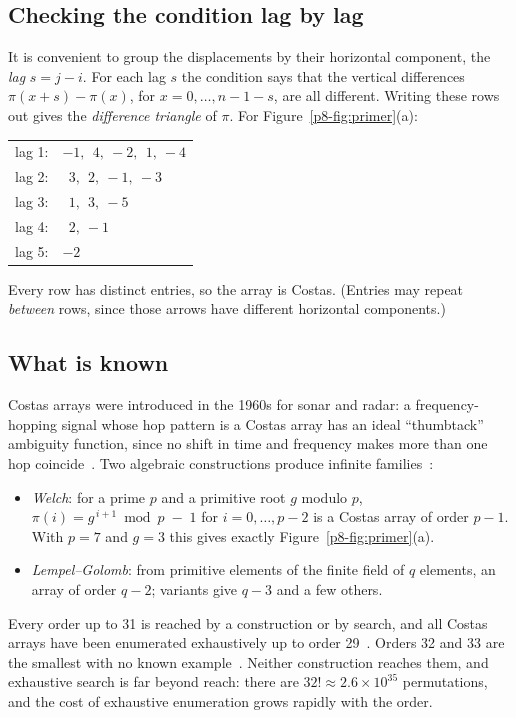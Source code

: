 \documentclass[11pt,a4paper,oneside]{report}
\theoremstyle{definition}
\begin{document}
\subsection{Checking the condition lag by lag}

It is convenient to group the displacements by their horizontal component, the \emph{lag}
$s=j-i$. For each lag $s$ the condition says that the vertical differences
$\pi(x+s)-\pi(x)$, for $x=0,\dots,n-1-s$, are all different. Writing these rows out gives
the \emph{difference triangle} of $\pi$. For Figure~\ref{p8-fig:primer}(a):
\begin{center}
\begin{tabular}{@{}r l@{}}
lag 1: & $-1,\ \ 4,\ -2,\ \ 1,\ -4$\\
lag 2: & $\ \ 3,\ \ 2,\ -1,\ -3$\\
lag 3: & $\ \ 1,\ \ 3,\ -5$\\
lag 4: & $\ \ 2,\ -1$\\
lag 5: & $-2$
\end{tabular}
\end{center}
Every row has distinct entries, so the array is Costas. (Entries may repeat \emph{between}
rows, since those arrows have different horizontal components.)

\subsection{What is known}

Costas arrays were introduced in the 1960s for sonar and radar: a frequency-hopping signal
whose hop pattern is a Costas array has an ideal ``thumbtack'' ambiguity function, since no
shift in time and frequency makes more than one hop coincide~\cite{p8-costas1984}. Two algebraic
constructions produce infinite families~\cite{p8-golombtaylor1984}:
\begin{itemize}
\item \emph{Welch}: for a prime $p$ and a primitive root $g$ modulo $p$,
$\pi(i)=g^{\,i+1}\bmod p\;-\;1$ for $i=0,\dots,p-2$ is a Costas array of order $p-1$. With
$p=7$ and $g=3$ this gives exactly Figure~\ref{p8-fig:primer}(a).
\item \emph{Lempel--Golomb}: from primitive elements of the finite field of $q$ elements, an
array of order $q-2$; variants give $q-3$ and a few others.
\end{itemize}
Every order up to 31 is reached by a construction or by search, and all Costas arrays have
been enumerated exhaustively up to order 29~\cite{p8-drakakis2011}. Orders 32 and 33 are the
smallest with no known example~\cite{p8-drakakis2006}. Neither construction reaches them, and
exhaustive search is far beyond reach: there are $32!\approx2.6\times10^{35}$ permutations,
and the cost of exhaustive enumeration grows rapidly with the order.
\end{document}
